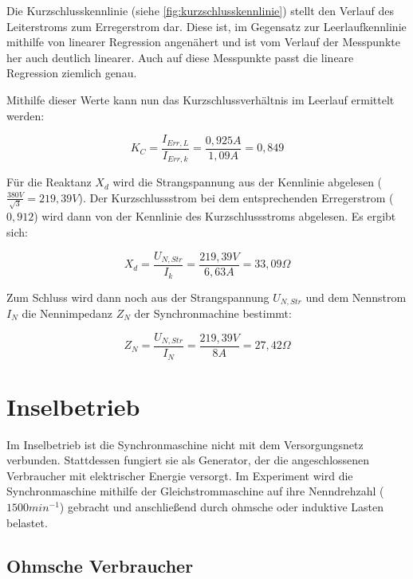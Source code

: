 \documentclass{report}
\begin{document}
Die Kurzschlusskennlinie (siehe \ref{fig:kurzschlusskennlinie}) stellt den Verlauf des Leiterstroms zum Erregerstrom dar. Diese ist, im Gegensatz zur Leerlaufkennlinie mithilfe von linearer Regression angenähert und ist vom Verlauf der Messpunkte her auch deutlich linearer. Auch auf diese Messpunkte passt die lineare Regression ziemlich genau.

Mithilfe dieser Werte kann nun das Kurzschlussverhältnis im Leerlauf ermittelt werden:

\begin{equation}
	\label{eq:1}
	K_{C} = \frac{I_{Err, L}}{I_{Err,k}} = \frac{0,925A}{1,09A} = 0,849
\end{equation}

Für die Reaktanz $X_{d}$ wird die Strangspannung aus der Kennlinie abgelesen ($\frac{380V}{\sqrt{3}} = 219,39V$). Der Kurzschlussstrom bei dem entsprechenden Erregerstrom ($0,912$) wird dann von der Kennlinie des Kurzschlussstroms abgelesen. Es ergibt sich:

\begin{equation}
	\label{eq:2}
	X_{d} = \frac{U_{N,Str}}{I_{k}} = \frac{219,39V}{6,63A} = 33,09\Omega
\end{equation}

Zum Schluss wird dann noch aus der Strangspannung $U_{N,Str}$ und dem Nennstrom $I_{N}$ die Nennimpedanz $Z_{N}$ der Synchronmachine bestimmt:

\begin{equation}
	\label{eq:3}
	Z_{N} = \frac{U_{N,Str}}{I_{N}} = \frac{219,39V}{8A} = 27,42\Omega
\end{equation}


\section{Inselbetrieb}
\label{sec:inselbetrieb}


Im Inselbetrieb ist die Synchronmaschine nicht mit dem Versorgungsnetz verbunden. Stattdessen fungiert sie als Generator, der die angeschlossenen Verbraucher mit elektrischer Energie versorgt. Im Experiment wird die Synchronmaschine mithilfe der Gleichstrommaschine auf ihre Nenndrehzahl ($1500 min^{-1}$) gebracht und anschließend durch ohmsche oder induktive Lasten belastet.

\subsection{Ohmsche Verbraucher}
\label{sec:ohmsche-verbraucher}
\end{document}
